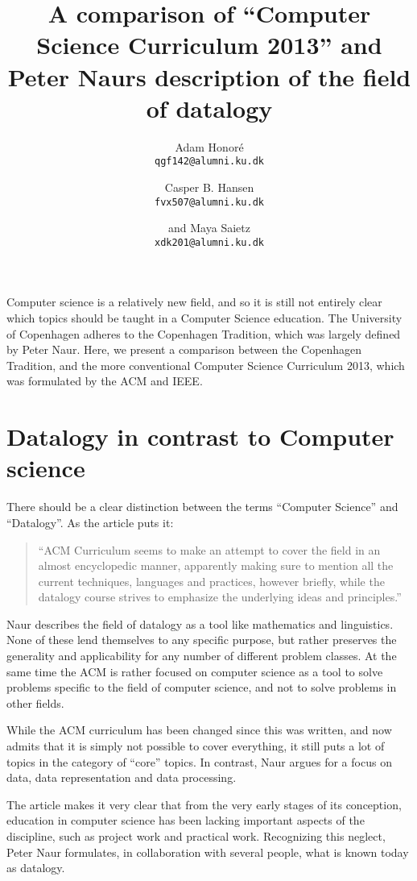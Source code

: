 \documentclass[11pt,a4paper]{article}
\title{A comparison of “Computer Science Curriculum 2013” and Peter Naurs description of the field of datalogy}
\author
{
	Adam Honoré\\
	{\tt qgf142@alumni.ku.dk}
	\and
	Casper B. Hansen\\
	{\tt fvx507@alumni.ku.dk}
	\and
	and Maya Saietz\\
	{\tt xdk201@alumni.ku.dk}
}
\begin{document}
\maketitle

\noindent Computer science is a relatively new field, and so it is still not entirely clear which topics should be taught in a
Computer Science education. The University of Copenhagen adheres to the Copenhagen Tradition, which was largely defined
by Peter Naur. Here, we present a comparison between the Copenhagen Tradition, and the more conventional Computer
Science Curriculum 2013, which was formulated by the ACM and IEEE.

\section{Datalogy in contrast to Computer science}
There should be a clear distinction between the terms ``Computer Science'' and ``Datalogy''. As the article\cite{froekjaer88} puts it:

\begin{quote}
    ``ACM Curriculum seems to make an attempt to cover the field in an almost encyclopedic manner, apparently making sure to
    mention all the current techniques, languages and practices, however briefly, while the datalogy course strives to
    emphasize the underlying ideas and principles.''
\end{quote}

Naur describes the field of datalogy as a tool like mathematics and linguistics. None of these lend themselves to any
specific purpose, but rather preserves the generality and applicability for any number of different problem classes. At
the same time the ACM is rather focused on computer science as a tool to solve problems specific to the field of
computer science, and not to solve problems in other fields.

While the ACM curriculum has been changed since this was written, and now admits that it is simply not possible to cover
everything, it still puts a lot of topics in the category of ``core'' topics. In contrast, Naur argues for a focus on
data, data representation and data processing\cite{naur66}.

The article\cite{froekjaer88} makes it very clear that from the very early stages of its conception, education in computer science has
been lacking important aspects of the discipline, such as project work and practical work. Recognizing this neglect,
Peter Naur formulates, in collaboration with several people, what is known today as datalogy.
\end{document}
